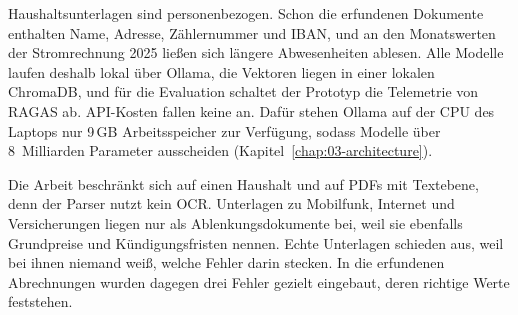 Haushaltsunterlagen sind personenbezogen. Schon die erfundenen Dokumente enthalten Name, Adresse, Zählernummer und IBAN, und an den Monatswerten der Stromrechnung 2025 ließen sich längere Abwesenheiten ablesen. Alle Modelle laufen deshalb lokal über Ollama, die Vektoren liegen in einer lokalen ChromaDB, und für die Evaluation schaltet der Prototyp die Telemetrie von RAGAS ab. API-Kosten fallen keine an. Dafür stehen Ollama auf der CPU des Laptops nur 9\,GB Arbeitsspeicher zur Verfügung, sodass Modelle über 8~Milliarden Parameter ausscheiden (Kapitel~\ref{chap:03-architecture}).

Die Arbeit beschränkt sich auf einen Haushalt und auf PDFs mit Textebene, denn der Parser nutzt kein OCR. Unterlagen zu Mobilfunk, Internet und Versicherungen liegen nur als Ablenkungsdokumente bei, weil sie ebenfalls Grundpreise und Kündigungsfristen nennen. Echte Unterlagen schieden aus, weil bei ihnen niemand weiß, welche Fehler darin stecken. In die erfundenen Abrechnungen wurden dagegen drei Fehler gezielt eingebaut, deren richtige Werte feststehen.
